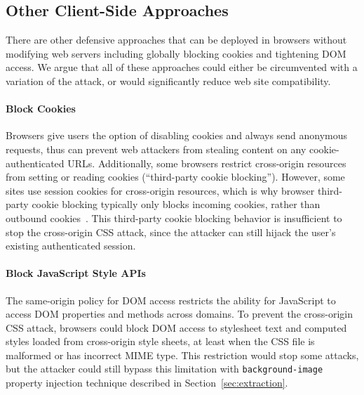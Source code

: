 \documentclass{acm_proc_article-sp}
\begin{document}
\subsection{Other Client-Side Approaches}
There are other defensive approaches that can be deployed in browsers without modifying web servers including globally blocking cookies and tightening DOM access.  We argue that all of these approaches could either be circumvented with a variation of the attack, or would significantly reduce web site compatibility.

\paragraph{Block Cookies} 
Browsers give users the option of disabling cookies
and always send anonymous requests, thus can prevent web attackers from
stealing content on any cookie-authenticated URLs. Additionally, some browsers
restrict cross-origin resources from setting or reading cookies (``third-party
cookie blocking''). However, some sites use session cookies for cross-origin
resources, which is why browser third-party cookie blocking typically only
blocks incoming cookies, rather than outbound
cookies~\cite{jackson06thirdpartycookies}. This third-party cookie blocking
behavior is insufficient to stop the cross-origin CSS attack, since the
attacker can still hijack the user's existing authenticated session.

\paragraph{Block JavaScript Style APIs}
The same-origin policy for DOM access restricts the ability for JavaScript to
access DOM properties and methods across domains. To prevent the cross-origin
CSS attack, browsers could block DOM access to stylesheet text and computed
styles loaded from cross-origin style sheets, at least when the CSS file is
malformed or has incorrect MIME type. This restriction would stop some
attacks, but the attacker could still bypass this limitation with
\texttt{background-image} property injection technique described in
Section~\ref{sec:extraction}.

\end{document}
